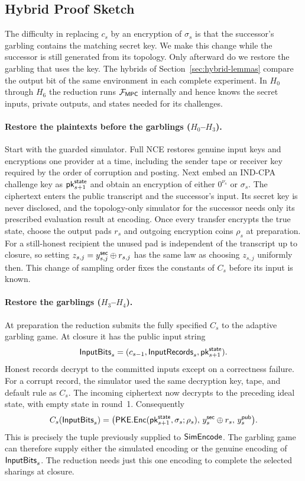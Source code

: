 \subsection{Hybrid Proof Sketch}
\label{sec:hybrids}

The difficulty in replacing $c_s$ by an encryption of $\sigma_s$ is
that the successor's garbling contains the matching secret key.
We make this change while the successor is still generated from its
topology.  Only afterward do we restore the garbling that uses the key.
The hybrids of Section~\ref{sec:hybrid-lemmas} compare the output bit of
the same environment in each complete experiment.  In $H_0$ through $H_6$ the reduction runs $\mathcal F_{\mathsf{MPC}}$
internally and hence knows the secret inputs, private outputs, and
states needed for its challenges.

\paragraph{Restore the plaintexts before the garblings ($H_0$--$H_3$).}
Start with the guarded simulator.  Full NCE restores genuine input
keys and encryptions one provider at a time, including the sender tape
or receiver key required by the order of corruption and posting.
Next embed an IND-CPA challenge key as $\mathsf{pk}^{\mathsf{state}}_{s+1}$ and obtain an
encryption of either $0^{\nu_s}$ or $\sigma_s$.  The ciphertext enters the public
transcript and the successor's input.  Its secret key is never
disclosed, and the topology-only simulator for the successor needs
only its prescribed evaluation result at encoding.  Once every transfer encrypts
the true state, choose the output pads $r_s$ and outgoing encryption
coins $\rho_s$ at preparation.  For a still-honest recipient the unused pad is independent of the
transcript up to closure, so setting $z_{s,j}=y^{\mathsf{sec}}_{s,j}\oplus r_{s,j}$
has the same law as choosing $z_{s,j}$ uniformly then.
This change of sampling order fixes the constants of $C_s$ before its
input is known.

\paragraph{Restore the garblings ($H_3$--$H_4$).}
At preparation the reduction submits the fully specified $C_s$ to
the adaptive garbling game.  At closure it has the public input string
\[
  \mathsf{InputBits}_s=(c_{s-1},\mathsf{InputRecords}_s,\mathsf{pk}^{\mathsf{state}}_{s+1}).
\]
Honest records decrypt to the committed inputs except on a correctness
failure.  For a corrupt record, the simulator used the same decryption
key, tape, and default rule as $C_s$.  The incoming ciphertext now
decrypts to the preceding ideal state, with empty state in round~1.
Consequently
\[
 C_s(\mathsf{InputBits}_s)=
 \bigl(\mathsf{PKE}.\mathsf{Enc}(\mathsf{pk}^{\mathsf{state}}_{s+1},\sigma_s;\rho_s),\,y^{\mathsf{sec}}_s\oplus r_s,\,
       y^{\mathsf{pub}}_s\bigr).
\]
This is precisely the tuple previously supplied to $\mathsf{SimEncode}$.
The garbling game can therefore supply either the simulated encoding or
the genuine encoding of $\mathsf{InputBits}_s$.  The reduction needs just this
one encoding to complete the selected sharings at closure.

